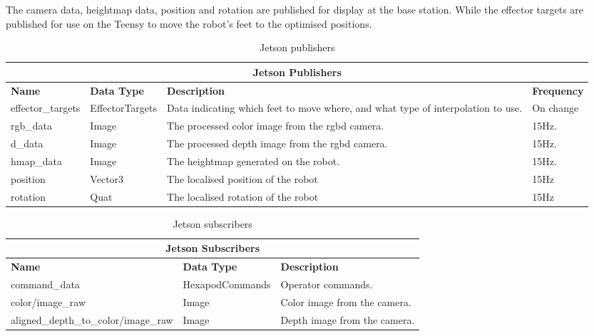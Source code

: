         The camera data, heightmap data, position and rotation are published for display at the base station.
        While the effector targets are published for use on the Teensy to move the robot's feet to the optimised positions.
        \newpage
        \begin{table}[h]
            \centering
            \begin{tabularx}{\textwidth}{| l | l | X | l |}
                \hline
                \multicolumn{4}{|c|}{\textbf{Jetson Publishers}} \\ \hline
                \textbf{Name} & \textbf{Data Type} & \textbf{Description} & \textbf{Frequency} \\ \hline
                effector\_targets & EffectorTargets & Data indicating which feet to move where, and what type of interpolation to use. & On change\\ \hline
                rgb\_data & Image & The processed color image from the \ac{rgbd} camera. & 15Hz. \\ \hline
                d\_data & Image & The processed depth image from the \ac{rgbd} camera. & 15Hz. \\ \hline
                hmap\_data & Image & The heightmap generated on the robot. & 15Hz. \\ \hline
                position & Vector3 & The localised position of the robot & 15Hz \\ \hline
                rotation & Quat & The localised rotation of the robot & 15Hz \\ \hline
            \end{tabularx}
            \caption{Jetson publishers}
            \label{tab:jetson_pubs}
        \end{table}
        \begin{table}[h]
            \centering
            \begin{tabularx}{\textwidth}{| l | l | X |}
                \hline
                \multicolumn{3}{|c|}{\textbf{Jetson Subscribers}} \\ \hline
                \textbf{Name}  & \textbf{Data Type} & \textbf{Description} \\ \hline
                command\_data & HexapodCommands & Operator commands. \\ \hline
                color/image\_raw & Image & Color image from the camera. \\ \hline
                aligned\_depth\_to\_color/image\_raw & Image & Depth image from the camera. \\ \hline
            \end{tabularx}
            \caption{Jetson subscribers}
            \label{tab:jetson_subs}
        \end{table}

